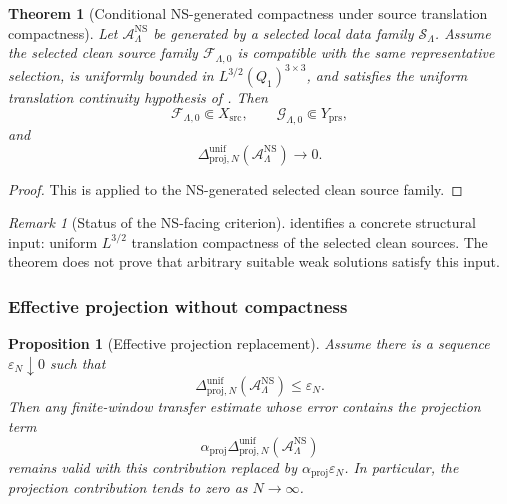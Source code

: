 \documentclass[11pt]{article}
\numberwithin{equation}{section}
\newtheorem{theorem}{Theorem}[section]
\newtheorem{proposition}[proposition]{Proposition}
\theoremstyle{definition}
\theoremstyle{remark}
\newtheorem{remark}[remark]{Remark}
\newcommand{\NS}{\mathrm{NS}}
\newcommand{\src}{\mathrm{src}}
\begin{document}
\begin{theorem}[Conditional NS-generated compactness under source translation compactness]
\label{thm:ns-generated-translation-compactness}
Let \(\mathcal A_{\Lambda}^{\NS}\) be generated by a selected local data family
\(\mathcal S_\Lambda\).  Assume the selected clean source family
\(\mathcal F_{\Lambda,0}\) is compatible with the same representative selection,
is uniformly bounded in \(L^{3/2}(Q_1)^{3\times3}\), and satisfies the uniform
translation continuity hypothesis of
.  Then
\[
    \mathcal F_{\Lambda,0}\Subset X_{\src},
    \qquad
    \mathcal G_{\Lambda,0}\Subset Y_{\mathrm{prs}},
\]
and
\[
    \Delta_{\mathrm{proj},N}^{\mathrm{unif}}
    (\mathcal A_{\Lambda}^{\NS})\to0.
\]
\end{theorem}

\begin{proof}
This is  applied to the
NS-generated selected clean source family.
\end{proof}

\begin{remark}[Status of the NS-facing criterion]
\label{rem:ns-compactness-status}
 identifies a concrete structural
input: uniform \(L^{3/2}\) translation compactness of the selected clean sources.
The theorem does not prove that arbitrary suitable weak solutions satisfy this
input.
\end{remark}

\subsubsection{Effective projection without compactness}

\begin{proposition}[Effective projection replacement]
\label{prop:effective-projection-replacement}
Assume there is a sequence \(\varepsilon_N\downarrow0\) such that
\[
    \Delta_{\mathrm{proj},N}^{\mathrm{unif}}
    (\mathcal A_{\Lambda}^{\NS})
    \le
    \varepsilon_N.
\]
Then any finite-window transfer estimate whose error contains the projection
term
\[
    \alpha_{\mathrm{proj}}
    \Delta_{\mathrm{proj},N}^{\mathrm{unif}}
    (\mathcal A_{\Lambda}^{\NS})
\]
remains valid with this contribution replaced by
\(\alpha_{\mathrm{proj}}\varepsilon_N\).  In particular, the projection
contribution tends to zero as \(N\to\infty\).
\end{proposition}
\end{document}

